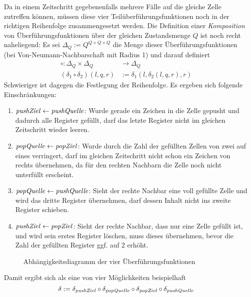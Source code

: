 \documentclass{article}
\begin{document}
Da in einem Zeitschritt gegebenenfalls mehrere Fälle auf die gleiche Zelle zutreffen können, müssen diese vier Teilüberführungsfunktionen noch in der richtigen Reihenfolge zusammengesetzt werden. Die Definition einer \emph{Komposition} von Überführungsfunktionen über der gleichen Zustandsmenge $Q$ ist noch recht naheliegend: Es sei $\Delta_Q := Q^{Q \times Q \times Q}$ die Menge dieser Überführungsfunktionen (bei Von-Neumann-Nachbarschaft mit Radius 1) und darauf definiert
\begin{align*}
    \circ : \Delta_Q \times \Delta_Q &\rightarrow \Delta_Q \\
    (\delta_1 \circ \delta_2)(l,q,r) &:= \delta_1(l,\delta_2(l,q,r),r)
\end{align*}
Schwieriger ist dagegen die Festlegung der Reihenfolge. Es ergeben sich folgende Einschränkungen:
\begin{enumerate}
    \item $\mathit{pushZiel} \leftarrow \mathit{pushQuelle}$: Wurde gerade ein Zeichen in die Zelle gepusht und dadurch alle Register gefüllt, darf \pushQuelle das letzte Register nicht im gleichen Zeitschritt wieder leeren.
    \item $\mathit{popQuelle} \leftarrow \mathit{popZiel}$: Wurde durch \popQuelle die Zahl der gefüllten Zellen von zwei auf eines verringert, darf \popZiel im gleichen Zeitschritt nicht schon ein Zeichen von rechts übernehmen, da für den rechten Nachbarn die Zelle noch nicht unterfüllt erscheint.
    \item $\mathit{popQuelle} \leftarrow \mathit{pushQuelle}$: Sieht der rechte Nachbar eine voll gefüllte Zelle und wird das dritte Register übernehmen, darf \popQuelle dessen Inhalt nicht ins zweite Register schieben.
    \item $\mathit{pushZiel} \leftarrow \mathit{popZiel}$: Sieht der rechte Nachbar, dass nur eine Zelle gefüllt ist, und wird sein erstes Register löschen, muss \popZiel dieses übernehmen, bevor \pushZiel die Zahl der gefüllten Register ggf. auf 2 erhöht.
\end{enumerate}

\begin{figure}[h]
    \centering
    \caption{Abhängigkeitsdiagramm der vier Überführungsfunktionen}
\end{figure}
Damit ergibt sich als eine von vier Möglichkeiten beispielhaft
\[ \delta := \delta_{\mathit{pushZiel}} \circ \delta_{\mathit{popQuelle}} \circ \delta_{\mathit{popZiel}} \circ \delta_{\mathit{pushQuelle}} \]
\end{document}
